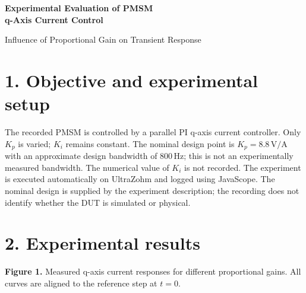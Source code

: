 \documentclass[a4paper,11pt]{article}
\begin{document}
\else
\begin{center}
{\Large\bfseries Experimental Evaluation of PMSM\\q-Axis Current Control}\par
\smallskip
{\large Influence of Proportional Gain on Transient Response}
\end{center}

\section*{1. Objective and experimental setup}
The recorded PMSM is controlled by a parallel PI
q-axis current controller. Only $K_p$ is varied; $K_i$ remains constant. The nominal
design point is $K_p=8.8\,\mathrm{V/A}$ with an approximate design bandwidth of
$800\,\mathrm{Hz}$; this is not an experimentally measured bandwidth. The numerical
value of $K_i$ is not recorded. The experiment is executed automatically on
UltraZohm and logged using JavaScope. The nominal design is supplied by the experiment description; the recording
does not identify whether the DUT is simulated or physical.


\section*{2. Experimental results}
\begin{center}
\end{center}
\vspace{3mm}
{\small\textbf{Figure 1.} Measured q-axis current responses for different proportional
gains. All curves are aligned to the reference step at $t=0$.}

\newpage
\end{document}
